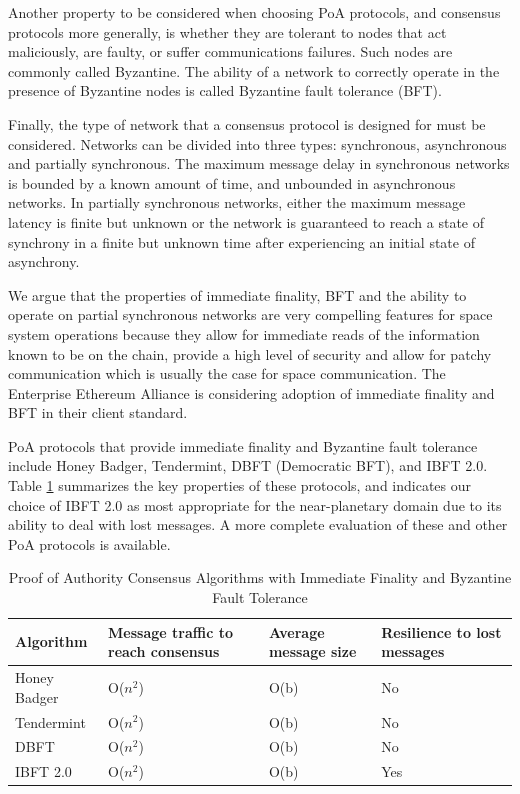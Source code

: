 \documentclass[journal ]{new-aiaa}
\begin{document}
Another property to be considered when choosing PoA protocols, and consensus protocols more generally, is whether they are tolerant to nodes that 
 act maliciously, 
are faulty, or suffer communications failures. 
 Such nodes are commonly called Byzantine\cite{lamport1982byzantine}. The ability of a network to correctly operate in the presence of Byzantine nodes is called Byzantine fault tolerance (BFT).

Finally, the type of network that a consensus protocol is designed for must be considered. Networks can be divided into three types: synchronous, asynchronous and partially synchronous\cite{dwork1988consensus}. The maximum message delay in synchronous networks is bounded by a known amount of time, and unbounded in asynchronous networks. In partially synchronous networks, either the maximum message latency is finite but unknown or the network is guaranteed to reach a state of synchrony in a finite but unknown time after experiencing an initial state of asynchrony.

We argue that the properties of immediate finality, BFT and the ability to operate on partial synchronous networks are very compelling features for space system operations because they allow for immediate reads of the information known to be on the chain, provide a high level of security and allow for patchy communication which is usually the case for space communication. The Enterprise Ethereum Alliance is considering adoption of immediate finality and BFT in their client standard\cite{eea-enhancedbft}.

PoA protocols that provide immediate finality and Byzantine fault tolerance include Honey Badger\cite{Miller_Xia_Croman_Shi_Song_2016}, Tendermint\cite{Buchman_Kwon_Milosevic_2018}, DBFT (Democratic BFT)\cite{Crain_Gramoli_Larrea_Raynal_2018}, and IBFT 2.0\cite{saltini-ibft2}. Table \ref{t:tab2-poa-algos} summarizes the key properties of these protocols, and indicates our choice of IBFT 2.0 as most appropriate for the near-planetary domain due to its ability to deal with lost messages. A more complete evaluation of these and other PoA protocols is available.\cite{hyland-wood-icssc2019}

\begin{table}
\caption{Proof of Authority Consensus Algorithms with Immediate Finality and Byzantine Fault Tolerance}
 \label{t:tab2-poa-algos}
\centering
\begin{tabular}{llll}
\hline
Algorithm    & Message traffic to reach consensus & Average message size & Resilience to lost messages \\
\hline
Honey Badger      & O($n^{2}$)    & O(b)   & No   \\
Tendermint       & O($n^{2}$)     & O(b)  & No      \\
DBFT       & O($n^{2}$)     & O(b)  & No      \\
IBFT 2.0 & O($n^{2}$)      & O(b)  & Yes       \\
\hline
\end{tabular}
\end{table}
\end{document}
